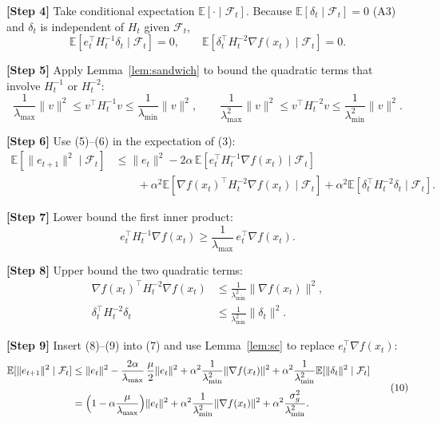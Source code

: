 \documentclass[11pt]{article}
\newcommand{\E}{\mathbb{E}}
\begin{document}
\medskip
\noindent\textbf{[Step 4]}  Take conditional expectation $\E[\cdot\mid\mathcal{F}_{t}]$.
Because $\E[\delta_{t}\mid\mathcal{F}_{t}]=0$ (A3) and $\delta_{t}$ is independent of
$H_{t}$ given $\mathcal{F}_{t}$,
\[
\E[e_{t}^{\!\top}H_{t}^{-1}\delta_{t}\mid\mathcal{F}_{t}]=0,
\qquad 
\E[\delta_{t}^{\!\top}H_{t}^{-2}\nabla f(x_{t})\mid\mathcal{F}_{t}]=0 .
\tag{5}
\]

\medskip
\noindent\textbf{[Step 5]}  Apply Lemma~\ref{lem:sandwich} to bound the quadratic
terms that involve $H_{t}^{-1}$ or $H_{t}^{-2}$:
\[
\frac{1}{\lambda_{\max}}\|v\|^{2}\le v^{\!\top}H_{t}^{-1}v\le
\frac{1}{\lambda_{\min}}\|v\|^{2},
\qquad
\frac{1}{\lambda_{\max}^{2}}\|v\|^{2}\le v^{\!\top}H_{t}^{-2}v\le
\frac{1}{\lambda_{\min}^{2}}\|v\|^{2}.
\tag{6}
\]

\medskip
\noindent\textbf{[Step 6]}  Use (5)–(6) in the expectation of (3):
\[
\begin{aligned}
\E[\|e_{t+1}\|^{2}\mid\mathcal{F}_{t}]
&\le \|e_{t}\|^{2}
-2\alpha\,\E\!\left[e_{t}^{\!\top}H_{t}^{-1}\nabla f(x_{t})\mid\mathcal{F}_{t}\right]\\
&\qquad+\alpha^{2}\E\!\left[\nabla f(x_{t})^{\!\top}H_{t}^{-2}
        \nabla f(x_{t})\mid\mathcal{F}_{t}\right]
+\alpha^{2}\E\!\left[\delta_{t}^{\!\top}H_{t}^{-2}\delta_{t}\mid\mathcal{F}_{t}\right].
\end{aligned}
\tag{7}
\]

\medskip
\noindent\textbf{[Step 7]}  Lower bound the first inner product:
\[
e_{t}^{\!\top}H_{t}^{-1}\nabla f(x_{t})
\ge \frac{1}{\lambda_{\max}}\,e_{t}^{\!\top}\nabla f(x_{t}).
\tag{8}
\]

\medskip
\noindent\textbf{[Step 8]}  Upper bound the two quadratic terms:
\[
\begin{aligned}
\nabla f(x_{t})^{\!\top}H_{t}^{-2}\nabla f(x_{t})
&\le \frac{1}{\lambda_{\min}^{2}}\|\nabla f(x_{t})\|^{2},\\[1mm]
\delta_{t}^{\!\top}H_{t}^{-2}\delta_{t}
&\le \frac{1}{\lambda_{\min}^{2}}\|\delta_{t}\|^{2}.
\end{aligned}
\tag{9}
\]

\medskip
\noindent\textbf{[Step 9]}  Insert (8)–(9) into (7) and use Lemma~\ref{lem:sc}
to replace $e_{t}^{\!\top}\nabla f(x_{t})$:
\[
\begin{aligned}
\E[\|e_{t+1}\|^{2}\mid\mathcal{F}_{t}]
&\le \|e_{t}\|^{2}
-\frac{2\alpha}{\lambda_{\max}}\,\frac{\mu}{2}\|e_{t}\|^{2}
+\alpha^{2}\frac{1}{\lambda_{\min}^{2}}\|\nabla f(x_{t})\|^{2}
+\alpha^{2}\frac{1}{\lambda_{\min}^{2}}\E[\|\delta_{t}\|^{2}\mid\mathcal{F}_{t}]\\[1mm]
&= \Bigl(1-\alpha\frac{\mu}{\lambda_{\max}}\Bigr)\|e_{t}\|^{2}
+\alpha^{2}\frac{1}{\lambda_{\min}^{2}}\|\nabla f(x_{t})\|^{2}
+\alpha^{2}\frac{\sigma_{g}^{2}}{\lambda_{\min}^{2}} .
\end{aligned}
\tag{10}
\]
\end{document}
